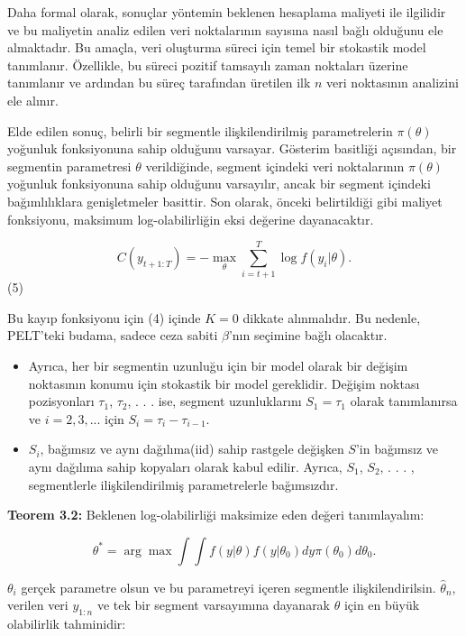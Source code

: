 \documentclass[12pt,twoside]{deuthesis}
\providecommand{\tightlist}{%
  \setlength{\itemsep}{0pt}\setlength{\parskip}{0pt}}
\begin{document}
Daha formal olarak, sonuçlar yöntemin beklenen hesaplama maliyeti ile ilgilidir ve bu maliyetin analiz edilen veri noktalarının sayısına nasıl bağlı olduğunu ele almaktadır. Bu amaçla, veri oluşturma süreci için temel bir stokastik model tanımlanır. Özellikle, bu süreci pozitif tamsayılı zaman noktaları üzerine tanımlanır ve ardından bu süreç tarafından üretilen ilk \(n\) veri noktasının analizini ele alınır.

Elde edilen sonuç, belirli bir segmentle ilişkilendirilmiş parametrelerin \(\pi(\theta)\) yoğunluk fonksiyonuna sahip olduğunu varsayar. Gösterim basitliği açısından, bir segmentin parametresi \(\theta\) verildiğinde, segment içindeki veri noktalarının \(\pi(\theta)\) yoğunluk fonksiyonuna sahip olduğunu varsayılır, ancak bir segment içindeki bağımlılıklara genişletmeler basittir. Son olarak, önceki belirtildiği gibi maliyet fonksiyonu, maksimum log-olabilirliğin eksi değerine dayanacaktır.

\[ C(y_{t+1:T}) = - \max_{\theta} \sum_{i=t+1}^{T} \log f(y_i|\theta). \] (5)

Bu kayıp fonksiyonu için (4) içinde \(K = 0\) dikkate alınmalıdır. Bu nedenle, PELT'teki budama, sadece ceza sabiti \(\beta\)'nın seçimine bağlı olacaktır.

\begin{itemize}
\tightlist
\item
  Ayrıca, her bir segmentin uzunluğu için bir model olarak bir değişim noktasının konumu için stokastik bir model gereklidir. Değişim noktası pozisyonları \(\tau_1\), \(\tau_2\), . . . ise, segment uzunluklarını \(S_1 = \tau_1\) olarak tanımlanırsa ve \(i = 2, 3, . . .\) için \(S_i = \tau_i - \tau_{i-1}\).
\item
  \(S_i\), bağımsız ve aynı dağılıma(iid) sahip rastgele değişken \(S\)'in bağımsız ve aynı dağılıma sahip kopyaları olarak kabul edilir. Ayrıca, \(S_1\), \(S_2\), . . . , segmentlerle ilişkilendirilmiş parametrelerle bağımsızdır.
\end{itemize}

\textbf{Teorem 3.2:} Beklenen log-olabilirliği maksimize eden değeri tanımlayalım:

\[ \theta^* = \arg\max \int \int f(y|\theta)f(y|\theta_0)dy\pi(\theta_0)d\theta_0. \]

\(\theta_i\) gerçek parametre olsun ve bu parametreyi içeren segmentle ilişkilendirilsin. \(\hat{\theta}_n\), verilen veri \(y_{1:n}\) ve tek bir segment varsayımına dayanarak \(\theta\) için en büyük olabilirlik tahminidir:
\end{document}
